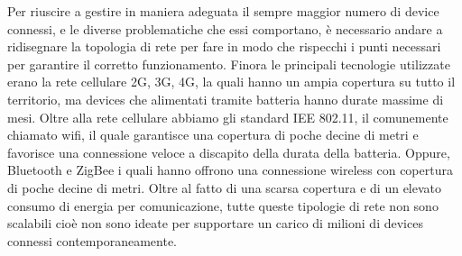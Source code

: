 Per riuscire a gestire in maniera adeguata il sempre maggior numero di device
connessi, e le diverse problematiche che essi comportano, è necessario andare a
ridisegnare la topologia di rete per fare in modo che rispecchi i punti necessari
per garantire il corretto funzionamento. Finora le principali tecnologie
utilizzate erano la rete cellulare 2G, 3G, 4G, la quali hanno un ampia copertura
su tutto il territorio, ma devices che alimentati tramite batteria hanno durate
massime di mesi. Oltre alla rete cellulare abbiamo gli standard IEE 802.11, il
comunemente chiamato wifi, il quale garantisce una copertura di poche decine di
metri e favorisce una connessione veloce a discapito della durata della
batteria. Oppure, Bluetooth e ZigBee i quali hanno offrono una connessione
wireless con copertura di poche decine di metri. Oltre al fatto di una scarsa
copertura e di un elevato consumo di energia per comunicazione, tutte queste
tipologie di rete non sono scalabili cioè non sono ideate per supportare un
carico di milioni di devices connessi contemporaneamente. 
